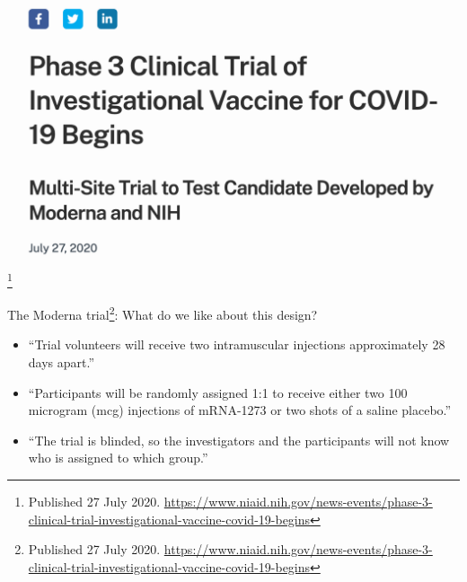 \documentclass{beamer}
\begin{document}
\begin{frame}
\includegraphics[width = \textwidth]{figures/moderna_begins}\footnote{Published 27 July 2020. \url{https://www.niaid.nih.gov/news-events/phase-3-clinical-trial-investigational-vaccine-covid-19-begins}}
\end{frame}

\begin{frame}{The Moderna trial\footnote{Published 27 July 2020. \url{https://www.niaid.nih.gov/news-events/phase-3-clinical-trial-investigational-vaccine-covid-19-begins}}: What do we like about this design?} \pause
\begin{itemize}
\item ``Trial volunteers will receive two intramuscular injections approximately 28 days apart.'' \pause
\item ``Participants will be randomly assigned 1:1 to receive either two 100 microgram (mcg) injections of mRNA-1273 or two shots of a saline placebo.'' \pause
\item ``The trial is blinded, so the investigators and the participants will not know who is assigned to which group.''
\end{itemize}
\end{frame}
\end{document}

